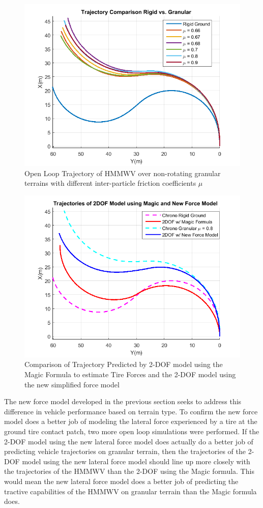 \documentclass[12pt,onecolumn]{report}
\begin{document}
\begin{figure}
	\centering
	\includegraphics[width=0.8\columnwidth]{Figs/trajectoryComparison_png.png}
	\caption{\small Open Loop Trajectory of HMMWV over non-rotating granular terrains with different inter-particle friction coefficients $\mu$}  
	\label{fig:openLoopmu}
\end{figure}

\begin{figure}
	\centering
	\includegraphics[width=0.8\columnwidth]{Figs/MagicvsNew.png}
	\caption{\small Comparison of Trajectory Predicted by 2-DOF model using the Magic Formula to estimate Tire Forces and the 2-DOF model using the new simplified force model}  
	\label{fig:MagicvsNew}
\end{figure}

The new force model developed in the previous section seeks to address this difference in vehicle performance based on terrain type. To confirm the new force model does a better job of modeling the lateral force experienced by a tire at the ground tire contact patch, two more open loop simulations were performed. If the 2-DOF model using the new lateral force model does actually do a better job of predicting vehicle trajectories on granular terrain, then the trajectories of the 2-DOF model using the new lateral force model should line up more closely with the trajectories of the HMMWV than the 2-DOF using the Magic formula. This would mean the new lateral force model does a better job of predicting the tractive capabilities of the HMMWV on granular terrain than the Magic formula does.
\end{document}
